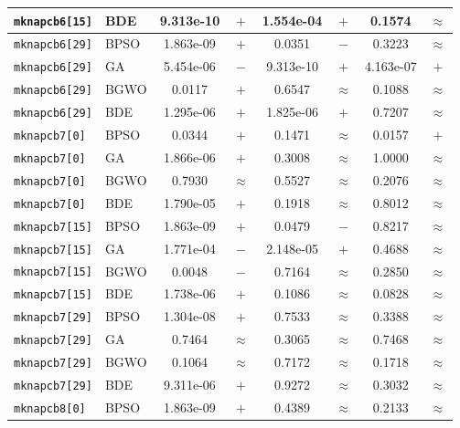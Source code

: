 \documentclass[journal,article,submit,moreauthors]{Definitions/mdpi}
\begin{document}
\begin{longtable}{llcccccc}
    \texttt{mknapcb6[15]} & BDE   & 9.313e-10 & $+$ & 1.554e-04 & $+$ &    0.1574 & $\approx$ \\
    \midrule
    \texttt{mknapcb6[29]} & BPSO  & 1.863e-09 & $+$ &    0.0351 & $-$ &    0.3223 & $\approx$ \\
    \texttt{mknapcb6[29]} & GA    & 5.454e-06 & $-$ & 9.313e-10 & $+$ & 4.163e-07 & $+$ \\
    \texttt{mknapcb6[29]} & BGWO  &    0.0117 & $+$ &    0.6547 & $\approx$ &    0.1088 & $\approx$ \\
    \texttt{mknapcb6[29]} & BDE   & 1.295e-06 & $+$ & 1.825e-06 & $+$ &    0.7207 & $\approx$ \\
    \midrule
    \texttt{mknapcb7[0]} & BPSO  &    0.0344 & $+$ &    0.1471 & $\approx$ &    0.0157 & $+$ \\
    \texttt{mknapcb7[0]} & GA    & 1.866e-06 & $+$ &    0.3008 & $\approx$ &    1.0000 & $\approx$ \\
    \texttt{mknapcb7[0]} & BGWO  &    0.7930 & $\approx$ &    0.5527 & $\approx$ &    0.2076 & $\approx$ \\
    \texttt{mknapcb7[0]} & BDE   & 1.790e-05 & $+$ &    0.1918 & $\approx$ &    0.8012 & $\approx$ \\
    \midrule
    \texttt{mknapcb7[15]} & BPSO  & 1.863e-09 & $+$ &    0.0479 & $-$ &    0.8217 & $\approx$ \\
    \texttt{mknapcb7[15]} & GA    & 1.771e-04 & $-$ & 2.148e-05 & $+$ &    0.4688 & $\approx$ \\
    \texttt{mknapcb7[15]} & BGWO  &    0.0048 & $-$ &    0.7164 & $\approx$ &    0.2850 & $\approx$ \\
    \texttt{mknapcb7[15]} & BDE   & 1.738e-06 & $+$ &    0.1086 & $\approx$ &    0.0828 & $\approx$ \\
    \midrule
    \texttt{mknapcb7[29]} & BPSO  & 1.304e-08 & $+$ &    0.7533 & $\approx$ &    0.3388 & $\approx$ \\
    \texttt{mknapcb7[29]} & GA    &    0.7464 & $\approx$ &    0.3065 & $\approx$ &    0.7468 & $\approx$ \\
    \texttt{mknapcb7[29]} & BGWO  &    0.1064 & $\approx$ &    0.7172 & $\approx$ &    0.1718 & $\approx$ \\
    \texttt{mknapcb7[29]} & BDE   & 9.311e-06 & $+$ &    0.9272 & $\approx$ &    0.3032 & $\approx$ \\
    \midrule
    \texttt{mknapcb8[0]} & BPSO  & 1.863e-09 & $+$ &    0.4389 & $\approx$ &    0.2133 & $\approx$ \\

\end{longtable}
\end{document}
